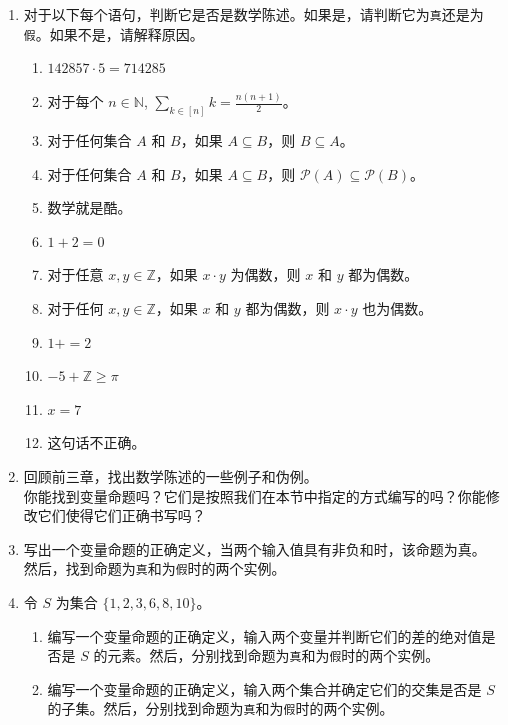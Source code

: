 \begin{enumerate}[label=(\arabic*)]
    \item 对于以下每个语句，判断它是否是数学陈述。如果是，请判断它为\verb|真|还是为\verb|假|。如果不是，请解释原因。
        \begin{enumerate}[label=(\alph*)]
            \item $142857 \cdot 5 = 714285$
            \item 对于每个 $n \in \mathbb{N}$, $\displaystyle{\sum_{k \in [n]}k=\frac{n(n+1)}{2}}$。
            \item 对于任何集合 $A$ 和 $B$，如果 $A \subseteq B$，则 $B \subseteq A$。
            \item 对于任何集合 $A$ 和 $B$，如果 $A \subseteq B$，则 $\mathcal{P}(A) \subseteq \mathcal{P}(B)$。
            \item 数学就是酷。
            \item $1 + 2 = 0$
            \item 对于任意 $x, y \in \mathbb{Z}$，如果 $x \cdot y$ 为偶数，则 $x$ 和 $y$ 都为偶数。
            \item 对于任何 $x, y \in \mathbb{Z}$，如果 $x$ 和 $y$ 都为偶数，则 $x \cdot y$ 也为偶数。
            \item $1+ = 2$
            \item $-5 + \mathbb{Z} \ge \pi$
            \item $x = 7$
            \item 这句话不正确。
        \end{enumerate}
    \item 回顾前三章，找出数学陈述的一些例子和伪例。\\
    你能找到变量命题吗？它们是按照我们在本节中指定的方式编写的吗？你能修改它们使得它们正确书写吗？
    \item 写出一个变量命题的正确定义，当两个输入值具有非负和时，该命题为真。\\
    然后，找到命题为\verb|真|和为\verb|假|时的两个实例。
    \item 令 $S$ 为集合 $\{1, 2, 3, 6, 8, 10\}$。
        \begin{enumerate}[label=(\alph*)]
            \item 编写一个变量命题的正确定义，输入两个变量并判断它们的差的绝对值是否是 $S$ 的元素。然后，分别找到命题为\verb|真|和为\verb|假|时的两个实例。
            \item 编写一个变量命题的正确定义，输入两个集合并确定它们的交集是否是 $S$ 的子集。然后，分别找到命题为\verb|真|和为\verb|假|时的两个实例。

\end{enumerate}
\end{enumerate}
